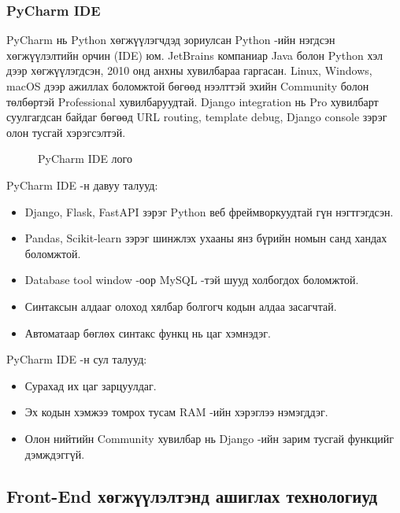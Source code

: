 \subsubsection{PyCharm IDE}
\par
PyCharm нь Python хөгжүүлэгчдэд зориулсан Python -ийн нэгдсэн хөгжүүлэлтийн орчин (IDE) юм. JetBrains компаниар Java болон Python хэл дээр хөгжүүлэгдсэн, 2010 онд анхны хувилбараа гаргасан. Linux, Windows, macOS дээр ажиллах боломжтой бөгөөд нээлттэй эхийн Community болон төлбөртэй Professional хувилбаруудтай. Django integration нь Pro хувилбарт суулгагдсан байдаг бөгөөд URL routing, template debug, Django console зэрэг олон тусгай хэрэгсэлтэй.

\begin{figure}[H]
    \centering
    \caption{PyCharm IDE лого}
    \label{fig:pycharmide-logo}
\end{figure}

\par PyCharm IDE -н давуу талууд:
\begin{itemize}
    \item Django, Flask, FastAPI зэрэг Python веб фреймворкуудтай гүн нэгтгэгдсэн.
    \item Pandas, Scikit-learn зэрэг шинжлэх ухааны янз бүрийн номын санд хандах боломжтой.
    \item Database tool window -оор MySQL -тэй шууд холбогдох боломжтой.
    \item Синтаксын алдааг олоход хялбар болгогч кодын алдаа засагчтай.
    \item Автоматаар бөглөх синтакс функц нь цаг хэмнэдэг.
\end{itemize}
PyCharm IDE -н сул талууд:
\begin{itemize}
    \item Сурахад их цаг зарцуулдаг.
    \item Эх кодын хэмжээ томрох тусам RAM -ийн хэрэглээ нэмэгддэг.
    \item Олон нийтийн Community хувилбар нь Django -ийн зарим тусгай функцийг дэмждэггүй.
\end{itemize}

\subsection{Front-End хөгжүүлэлтэнд ашиглах технологиуд}

